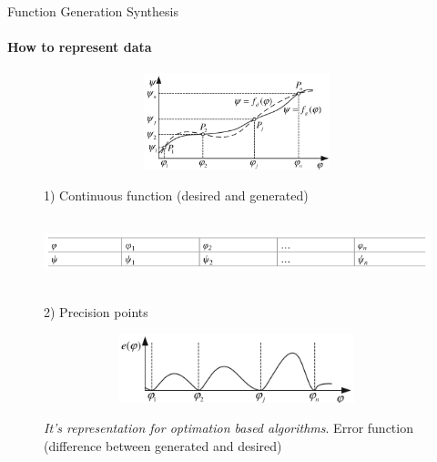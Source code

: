\documentclass[aspectratio=169]{beamer}
\begin{document}
\begin{frame}[t]{Function Generation Synthesis}
\framesubtitle{How to represent data}

\vspace{-0.6cm}
\begin{figure}[H]
    \begin{minipage}{0.58\textwidth}
        \centering\includegraphics[height=2.8cm,width=1\textwidth,keepaspectratio]{func_gen3.png}
    \end{minipage}\hfill
    \begin{minipage}{0.40\textwidth}
        1) Continuous function (desired and generated)
        \label{fig:func_gen3.png}
    \end{minipage}
\end{figure}
\vspace{-0.6cm}

\begin{figure}[H]
    \begin{minipage}{0.58\textwidth}
        \centering\includegraphics[height=2cm,width=1\textwidth,keepaspectratio]{func_gen4.png}
    \end{minipage}\hfill
    \begin{minipage}{0.40\textwidth}
        2) Precision points
        \label{fig:func_gen4.png}
    \end{minipage}
\end{figure}
\vspace{-0.6cm}

\begin{figure}[H]
    \begin{minipage}{0.58\textwidth}
        \centering\includegraphics[height=2cm,width=1\textwidth,keepaspectratio]{func_gen5.png}
    \end{minipage}\hfill
    \begin{minipage}{0.40\textwidth}
        \textit{It's representation for optimation based algorithms}. Error function (difference between generated and desired)
        \label{fig:func_gen5.png}
    \end{minipage}
\end{figure}
\end{frame}
\end{document}
